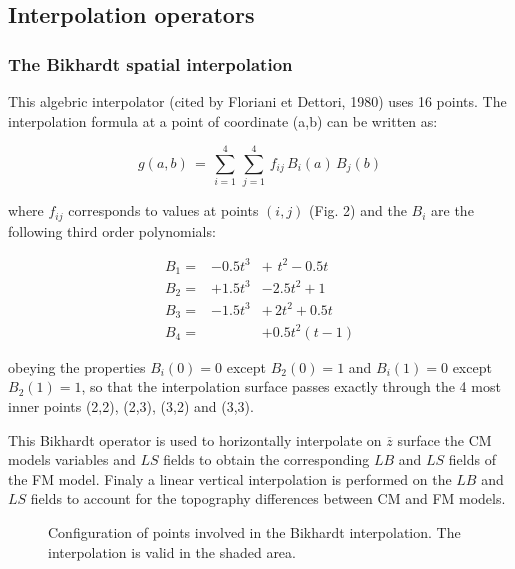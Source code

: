 \subsection{Interpolation operators}

\subsubsection{The Bikhardt spatial interpolation}

 This algebric interpolator (cited by Floriani et Dettori, 1980)
uses 16 points. The interpolation formula at a point of coordinate (a,b) can be
written as:

\begin{equation}
\label{Bik0}
g(a,b) \, =  \, \sum_{i=1}^4  \, \sum_{j=1}^4  \,
f_{ij} \,B_{i}(a) \,B_{j}(b)
\end{equation}

\noindent where $f_{ij}$ corresponds to values at points $(i,j)$
(Fig. 2) and the $B_{i}$ are the following third order polynomials:

\vspace{-.3cm}
\begin{eqnarray}
B_{1} = &-0.5 t^3 & + \,\,t^2 -0.5t   \nonumber \\
B_{2} = &+1.5 t^3 & - 2.5 t^2 +1 \\
B_{3} = &-1.5 t^3 & + \,2 t^2 +0.5t   \nonumber \\
B_{4} = &         & + 0.5 t^2 (t-1)   \nonumber
\end{eqnarray}

\noindent obeying the properties $B_{i}(0)=0$ except $B_{2}(0)=1$
and $B_{i}(1)=0$ except $B_{2}(1)=1$, so that the interpolation surface
passes exactly through the 4 most inner points (2,2), (2,3), (3,2) and (3,3).

 This Bikhardt operator is used to horizontally interpolate on
$\overline{z}$ surface the CM models variables and $LS$ fields to obtain the
corresponding $LB$ and $LS$ fields of the FM model. Finaly a linear vertical
interpolation is performed on the $LB$ and $LS$ fields to account for the
topography  differences between CM and FM models.

\begin{figure}[pbh]
\vspace{1cm}
\caption{Configuration of points involved in the Bikhardt interpolation.
The interpolation is valid in the shaded area.}
\end{figure}

